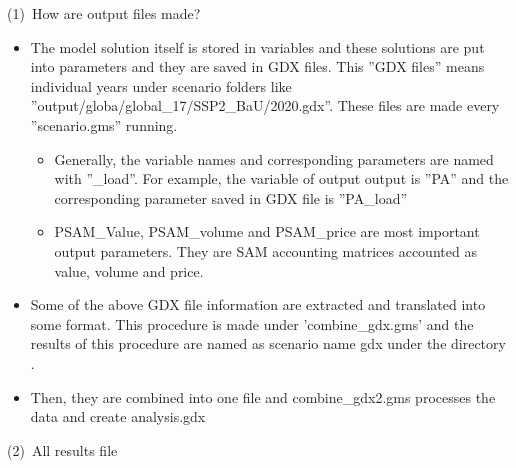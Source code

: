 \documentclass[10pt,a4paper,titlepage,dvipdfmx]{book}
\begin{document}
(1)~How are output files made?
\begin{itemize}
\item The model solution itself is stored in variables and these solutions are put into parameters and they are saved in GDX files. This ''GDX files'' means individual years under scenario folders like ''output/globa/global\_17/SSP2\_BaU/2020.gdx''. These files are made every ''scenario.gms'' running. 
\begin{itemize}
\item Generally, the variable names and corresponding parameters are named with ''\_load''. For example, the variable of output output is ''PA'' and the corresponding parameter saved in GDX file is ''PA\_load''
\item PSAM\_Value, PSAM\_volume and PSAM\_price are most important output parameters. They are SAM accounting matrices accounted as value, volume and price.
\end{itemize}

\item Some of the above GDX file information are extracted and translated into some format. This procedure is made under 'combine\_gdx.gms' and the results of this procedure are named as scenario name gdx under the directory .
\item Then, they are combined into one file and combine\_gdx2.gms processes the data and create analysis.gdx
\end{itemize}
(2)~All results file\label{mark-(2)}
\end{document}
